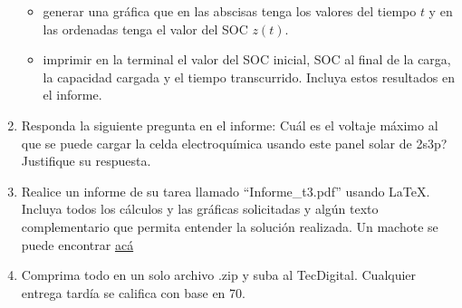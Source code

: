 \documentclass[12pt]{article}
\begin{document}
\begin{enumerate}
\begin{itemize}
        \item generar una gráfica que en las abscisas tenga los valores del tiempo $t$ y en las ordenadas tenga el valor del SOC $z(t)$.
        \item imprimir en la terminal el valor del SOC inicial, SOC al final de la carga, la capacidad cargada y el tiempo transcurrido. Incluya estos resultados en el informe.
    \end{itemize}
    \item Responda la siguiente pregunta en el informe: Cuál es el voltaje máximo al que se puede cargar la celda electroquímica usando este panel solar de 2s3p? Justifique su respuesta.
    \item Realice un informe de su tarea llamado ``Informe\_t3.pdf'' usando \LaTeX. Incluya todos los cálculos y las gráficas solicitadas y algún texto complementario que permita entender la solución realizada. Un machote se puede encontrar \href{https://www.overleaf.com/read/phnwtckqwqwc}{acá}
    \item Comprima todo en un solo archivo .zip y suba al TecDigital. Cualquier entrega tardía se califica con base en 70. 
\end{enumerate}



\end{document}
